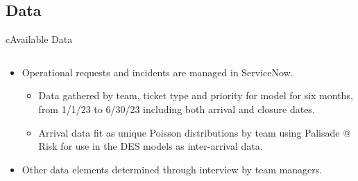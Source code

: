 \subsection*{Data}

\begin{myslide}{c}{Available Data}

\begin{columns}

\begin{column}{1\textwidth}

\begin{itemize}

\item Operational requests and incidents are managed in ServiceNow.

    \begin{itemize}

    \item Data gathered by team, ticket type and priority for model for six months, from 1/1/23 to 6/30/23 including both arrival and closure dates.

    \item Arrival data fit as unique Poisson distributions by team using Palisade @ Risk for use in the DES models as inter-arrival data.

    \end{itemize}

\item Other data elements determined through interview by team managers.

\end{itemize}


\end{column}

\end{columns}

\end{myslide}

